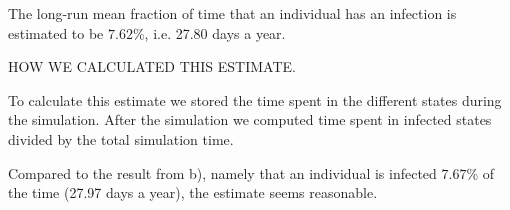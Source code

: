 The long-run mean fraction of time that an individual has an infection is estimated to be $7.62\%$, i.e. 27.80 days a year.  

HOW WE CALCULATED THIS ESTIMATE.

To calculate this estimate we stored the time spent in the different states during the simulation. After the simulation we computed time spent in infected states divided by the total simulation time. 

Compared to the result from b), namely that an individual is infected $7.67\%$ of the time  (27.97 days a year), the estimate seems reasonable. 



